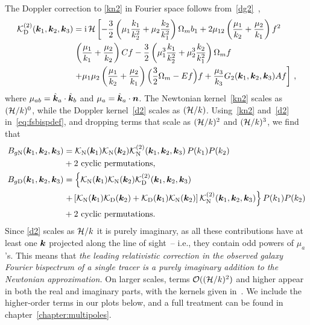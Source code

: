 The Doppler correction to \eqref{kn2} in Fourier space follows from~\eqref{dg2}~\citep{Jolicoeur:2017eyi},
\begin{align}
\mathcal{K}^{(2)}_{\mathrm{D}}(\bm {k}_1,\bm {k}_2,\bm {k}_3) &= \mathrm{i\,} \mathcal{H}
\left[ - \frac{3}{2} \left( \mu_{1} \frac{k_{1}}{k_2^2} + \mu_{2} \frac{k_{2}}{k_1^2} \right) \Omega_m b_1 + 2\mu_{12} \left( \frac{\mu_{1}}{k_2} + \frac{\mu_{2}}{k_1}\right) f^2  \right. \nonumber \\
& \left. \left( \frac{\mu_{1}}{k_1} + \frac{\mu_{2}}{k_2} \right){C} f - \frac{3}{2} \left( \mu_{1}^3 \frac{k_{1}}{k_2^2} + \mu_{2}^3 \frac{k_{2}}{k_1^2} \right)\Omega_m f \nonumber\right.  \\
&\left. + \mu_{1}\mu_{2}\left( \frac{\mu_{1}}{k_2} + \frac{\mu_{2}}{k_1} \right) {\Big( \frac{3}{2} \Omega_m - E f\Big) f} + \frac{\mu_{3}}{k_{3}} G_{2}(\bm{k}_{1}, \bm{k}_{2},\bm {k}_3){A} f\right]\,, \label{d2}
\end{align}
where $\mu_{ab}=\hat{\bm {k}}_a\cdot \hat{\bm {k}}_b$ and $\mu_a=\hat{\bm {k}}_a\cdot\bm n$. 
The Newtonian kernel~\eqref{kn2} scales as $(\mathcal{H}/k)^{0}$, while the Doppler kernel~\eqref{d2} scales as $(\mathcal{H}/k)$. 
Using~\eqref{kn2} and~\eqref{d2} in~\eqref{eq:fsbispdef}, and dropping terms that scale as $(\mathcal{H}/k)^{2}$ and $(\mathcal{H}/k)^{3}$,
we find that
\begin{align}
B_{g{\mathrm{N}}}(\bm {k}_1,\bm {k}_2,\bm {k}_3) &=  \mathcal{K}_{\mathrm{N}}(\bm {k}_1)\mathcal{K}_{\mathrm{N}}(\bm {k}_2)\mathcal{K}^{(2)}_{\mathrm{N}}(\bm {k}_1,\bm {k}_2,\bm {k}_3)\,P(k_{1})P(k_{2})  \nonumber \\
& +\text{2 cyclic permutations,} \\
B_{g{\mathrm{D}}}(\bm {k}_1,\bm {k}_2,\bm {k}_3) &= \left\{
\mathcal{K}_{\mathrm{N}}(\bm {k}_1)\mathcal{K}_{\mathrm{N}}(\bm {k}_2)\mathcal{K}^{(2)}_{\mathrm{D}}(\bm {k}_1,\bm {k}_2,\bm {k}_3) \right.
\nonumber\\ \label{bd}
& \left. +\left[ \mathcal{K}_{\mathrm{N}}(\bm {k}_1)\mathcal{K}_{\mathrm{D}}(\bm {k}_2)+\mathcal{K}_{\mathrm{D}}(\bm {k}_1)\mathcal{K}_{\mathrm{N}}(\bm {k}_2) \right]\mathcal{K}^{(2)}_{\mathrm{N}}(\bm {k}_1,\bm {k}_2,\bm {k}_3)
\right\}
P(k_{1})P(k_{2}) \nonumber \\
& +\text{2 cyclic permutations.}
\end{align}
Since \eqref{d2} scales as $\mathcal{H}/k$ it is purely imaginary, as all these contributions have at least one $\bm {k}$ projected along the line of sight~-- i.e.,  they contain odd powers of $\mu_a$'s. This means that {\em the leading relativistic correction in the observed galaxy Fourier bispectrum of a single tracer is a purely imaginary addition to the Newtonian approximation.} On larger scales, terms $\mathcal{O}((\mathcal{H}/k)^{2})$ and higher appear in both the real and imaginary parts, with the kernels given in~\cite{Umeh:2016nuh,Jolicoeur:2017nyt,Jolicoeur:2017eyi,Jolicoeur:2018blf}. We include the higher-order terms in our plots below, and a full treatment can be found in chapter~\ref{chapter:multipoles}.


